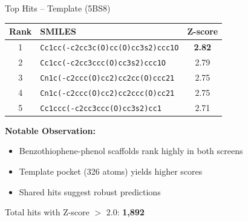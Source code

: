 \documentclass[aspectratio=169,xcolor=table]{beamer}
\begin{document}
\begin{frame}{Top Hits -- Template (5BS8)}
\begin{center}
\scriptsize
\begin{tabular}{clc}
\toprule
\textbf{Rank} & \textbf{SMILES} & \textbf{Z-score} \\
\midrule
1 & \texttt{Cc1cc(-c2cc3c(O)cc(O)cc3s2)ccc1O} & \textbf{2.82} \\
2 & \texttt{Cc1cc(-c2cc3ccc(O)cc3s2)ccc1O} & 2.79 \\
3 & \texttt{Cn1c(-c2ccc(O)cc2)cc2cc(O)ccc21} & 2.75 \\
4 & \texttt{Cn1c(-c2ccc(O)cc2)cc2ccc(O)cc21} & 2.75 \\
5 & \texttt{Cc1ccc(-c2cc3ccc(O)cc3s2)cc1} & 2.71 \\
\bottomrule
\end{tabular}
\end{center}
\normalsize

\vspace{0.2cm}
\textbf{Notable Observation:}
\begin{itemize}\setlength{\itemsep}{0pt}
    \item Benzothiophene-phenol scaffolds rank highly in both screens
    \item Template pocket (326 atoms) yields higher scores
    \item \textcolor{druggreen}{Shared hits} suggest robust predictions
\end{itemize}

\footnotesize Total hits with Z-score $>$ 2.0: \textbf{1,892}
\end{frame}
\end{document}
